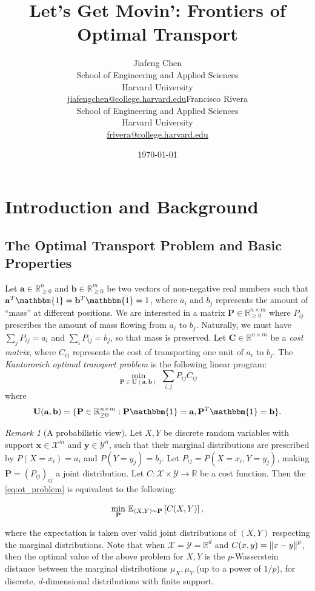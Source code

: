 \documentclass{article}
\title{Let's Get Movin': Frontiers of Optimal Transport}
\author{Jiafeng Chen\\School of Engineering and Applied Sciences\\Harvard University\\\url{jiafengchen@college.harvard.edu}\And Francisco Rivera\\School of Engineering and Applied Sciences\\Harvard University\\\url{frivera@college.harvard.edu}}
\date{\today}
\renewcommand{\b}{\mathbf}
\newcommand{\R}{\mathbb{R}}
\newcommand{\one}{\mathbbm{1}}
\newcommand{\E}{\mathbb{E}}
\theoremstyle{definition}
\theoremstyle{remark}
\newtheorem{rmk}{Remark}
\newcommand{\feasible}{\b U(\b a, \b b)}
\begin{document}
\maketitle
\section{Introduction and Background}

\subsection{The Optimal Transport Problem and Basic Properties}

Let $\b a \in \R^n_{\ge 0}$ and $\b b \in \R^m_{\ge 0}$ be two vectors of
non-negative real numbers such that $\b a^T \one = \b b^T \one = 1$, where $a_i$
and $b_j$ represents the amount of ``mass'' at different positions. We are
interested in a matrix $\b P \in \R^{n\times m}_{\ge 0}$ where $P_{ij}$
prescribes the amount of mass flowing from $a_i$ to $b_j$. Naturally, we must
have $\sum_j P_{ij} = a_i$ and $\sum_i P_{ij} = b_j$, so that mass is preserved.
Let $\b C \in \R^{n\times m}$ be a \emph{cost matrix}, where $C_{ij}$ represents
the cost of transporting one unit of $a_i$ to $b_j$. The \emph{Kantorovich
optimal transport problem} is the following linear program:
\begin{equation}
\label{eq:ot_problem}
\min_{\b P \in \feasible} \, \sum_{i,j} P_{ij} C_{ij} \tag{Kantorovich}
\end{equation}
where \[
\feasible = \{\b P \in \R^{n\times m}_{\ge 0}: \b P \one = \b a, \b P^T \one =
 \b b\}.
\]

\begin{rmk}[A probabilistic view]
Let $X,Y$ be discrete random variables with support $\b x \in \mathcal X^m$ and
$\b y \in \mathcal Y^n$, such that their marginal distributions are prescribed
by $P(X = x_i) = a_i$ and $P(Y = y_j) = b_j$. Let $P_{ij} = P(X = x_i, Y =
y_j)$, making $\b P = (P_{ij})_ {ij}$ a joint distribution. Let $C: \mathcal X
\times \mathcal Y \to \R$ be a cost function. Then the \eqref{eq:ot_problem} is
equivalent to the following:

\[ \min_{\b P}\, \E_{(X,Y) \sim \b P}\bk{C(X,Y)}, \]

where the expectation is taken over valid joint distributions of $(X,Y)$
respecting the marginal distributions. Note that when $\mathcal X = \mathcal Y =
\R^d$ and $C(x,y) = \left\lVert x-y\right\rVert^p$, then the optimal value of the above problem
for $X,Y$ is the $p$-Wasserstein distance between the marginal distributions
$\mu_X,\mu_Y$ (up to a power of $1/p$), for discrete, $d$-dimensional
distributions with finite support.
\end{rmk}
\end{document}
